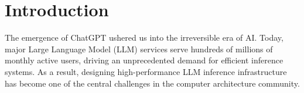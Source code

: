 \section{Introduction}
\label{section_1}

The emergence of ChatGPT ushered us into the irreversible era of AI. Today, major Large Language Model (LLM) services serve hundreds of millions of monthly active users, driving an unprecedented demand for efficient inference systems. As a result, designing high-performance LLM inference infrastructure has become one of the central challenges in the computer architecture community.



